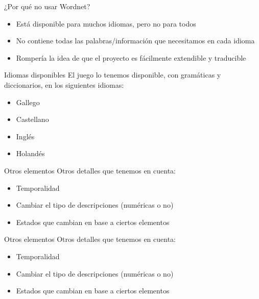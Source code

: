\begin{tframe}{¿Por qué no usar Wordnet?}
	\begin{itemize}
		\item Está disponible para muchos idiomas, pero no para todos
		\item No contiene todas las palabras/información que necesitamos en cada idioma
		\item<+-| alert@+> Rompería la idea de que el proyecto es fácilmente extendible y traducible
	\end{itemize}
\end{tframe}


\begin{frame}[t, fragile]{Idiomas disponibles}
	El juego lo tenemos disponible, con gramáticas y diccionarios, en los siguientes idiomas:
	\begin{itemize}
		\item Gallego
		\item Castellano
		\item Inglés
		\item Holandés
	\end{itemize}
\end{frame}


\begin{tframe}{Otros elementos}
	Otros detalles que tenemos en cuenta:
	\begin{itemize}
		\item Temporalidad
		\item Cambiar el tipo de descripciones (numéricas o no)
		\item Estados que cambian en base a ciertos elementos
	\end{itemize}
\end{tframe}

\begin{tframe}{Otros elementos}
	Otros detalles que tenemos en cuenta:
	\begin{itemize}
		\item<+-| alert@+> Temporalidad
		\item Cambiar el tipo de descripciones (numéricas o no)
		\item Estados que cambian en base a ciertos elementos
	\end{itemize}
\end{tframe}

